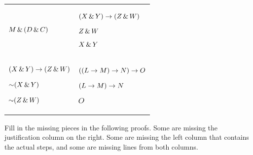 \begin{exercises}
\begin{longtabu}{X[1]X[1]}
\begin{earg*}
	\itemc[.3] $M \,\&\, (D \,\&\, C)$
	\end{earg*}
&

\item %
	\begin{earg*}
	\item $(X \,\&\, Y) \rightarrow (Z \,\&\, W)$
	\item $Z \,\&\, W$
 
	\itemc[.3]$X \,\&\, Y$
	\end{earg*}
\\

\item %
	\begin{earg*}
	\item $(X \,\&\, Y) \rightarrow (Z \,\&\, W)$
	\item $\mathord{\sim} (X \,\&\, Y)$
 
	\itemc[.3]$\mathord{\sim}(Z \,\&\, W)$
	\end{earg*}
&

\item %
	\begin{earg*}
	\item $((L \rightarrow M) \rightarrow N) \rightarrow O$
	\item $(L \rightarrow M) \rightarrow N$
 
	\itemc[.3]$O$
	\end{earg*}

\end{longtabu}
\end{exercises}

\vspace{-8pt}

\noindent\problempart \label{pr.justifySLproof} Fill in the missing pieces in the following proofs. Some are missing the justification column on the right. Some are missing the left column that contains the actual steps, and some are missing lines from both columns.

